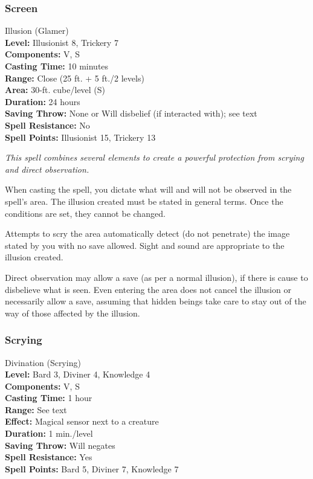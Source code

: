 \subsubsection{Screen}
\label{Spell:Screen}
Illusion (Glamer)
\\ \textbf{Level:} Illusionist 8, Trickery 7
\\ \textbf{Components:} V, S
\\ \textbf{Casting Time:} 10 minutes
\\ \textbf{Range:} Close (25 ft. + 5 ft./2 levels)
\\ \textbf{Area:} 30-ft. cube/level (S)
\\ \textbf{Duration:} 24 hours
\\ \textbf{Saving Throw:} None or Will disbelief (if interacted with); see text
\\ \textbf{Spell Resistance:} No
\\ \textbf{Spell Points:} Illusionist 15, Trickery 13

\emph{This spell combines several elements to create a powerful protection from scrying and direct observation. }

When casting the spell, you dictate what will and will not be observed in the spell's area. 
The illusion created must be stated in general terms. Once the conditions are set, they cannot be changed.

Attempts to scry the area automatically detect (do not penetrate) the image stated by you with no save allowed. 
Sight and sound are appropriate to the illusion created.

Direct observation may allow a save (as per a normal illusion), 
if there is cause to disbelieve what is seen. 
Even entering the area does not cancel the illusion or necessarily allow a save, 
assuming that hidden beings take care to stay out of the way of those affected by the illusion. 
\subsubsection{Scrying}
\label{Spell:Scrying}
Divination (Scrying)
\\ \textbf{Level:} Bard 3, Diviner 4, Knowledge 4
\\ \textbf{Components:} V, S
\\ \textbf{Casting Time:} 1 hour
\\ \textbf{Range:} See text
\\ \textbf{Effect:} Magical sensor next to a creature
\\ \textbf{Duration:} 1 min./level
\\ \textbf{Saving Throw:} Will negates
\\ \textbf{Spell Resistance:} Yes
\\ \textbf{Spell Points:} Bard 5, Diviner 7, Knowledge 7

